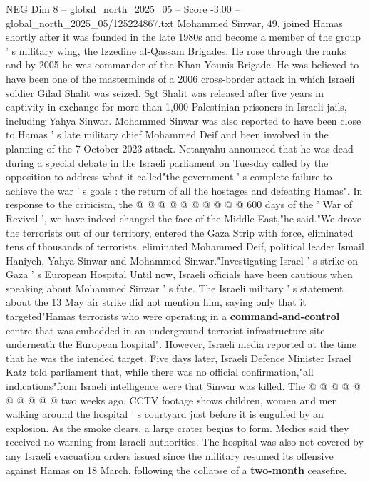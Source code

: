 \begin{textsample}{NEG Dim 8 – global\_north\_2025\_05 – Score -3.00 – global\_north\_2025\_05/125224867.txt}  \label{ex:f8_neg_054}
Mohammed Sinwar, 49, joined Hamas shortly after it was founded in the late 1980s and become a member of the group ' s military wing, the Izzedine al-Qassam Brigades.
He rose through the ranks and by 2005 he was commander of the Khan Younis Brigade.
He was believed to have been one of the masterminds of a 2006 cross-border attack in which Israeli soldier Gilad Shalit was seized.
Sgt Shalit was released after five years in captivity in exchange for more than 1,000 Palestinian prisoners in Israeli jails, including Yahya Sinwar.
Mohammed Sinwar was also reported to have been close to Hamas ' s late military chief Mohammed Deif and been involved in the planning of the 7 October 2023 attack.
Netanyahu announced that he was dead during a special debate in the Israeli parliament on Tuesday called by the opposition to address what it called"the government ' s complete failure to achieve the war ' s goals : the return of all the hostages and defeating Hamas".
In response to the criticism, the @ @ @ @ @ @ @ @ @ @ 600 days of the ' War of Revival ', we have indeed changed the face of the Middle East,"he said."We drove the terrorists out of our territory, entered the Gaza Strip with force, eliminated tens of thousands of terrorists, eliminated Mohammed Deif, political leader Ismail Haniyeh, Yahya Sinwar and Mohammed Sinwar."Investigating Israel ' s strike on Gaza ' s European Hospital Until now, Israeli officials have been cautious when speaking about Mohammed Sinwar ' s fate.
The Israeli military ' s statement about the 13 May air strike did not mention him, saying only that it targeted"Hamas terrorists who were operating in a \textbf{command-and-control} centre that was embedded in an underground terrorist infrastructure site underneath the European hospital".
However, Israeli media reported at the time that he was the intended target.
Five days later, Israeli Defence Minister Israel Katz told parliament that, while there was no official confirmation,"all indications"from Israeli intelligence were that Sinwar was killed.
The @ @ @ @ @ @ @ @ @ @ two weeks ago.
CCTV footage shows children, women and men walking around the hospital ' s courtyard just before it is engulfed by an explosion.
As the smoke clears, a large crater begins to form.
Medics said they received no warning from Israeli authorities.
The hospital was also not covered by any Israeli evacuation orders issued since the military resumed its offensive against Hamas on 18 March, following the collapse of a \textbf{two-month} ceasefire.

\end{textsample}
